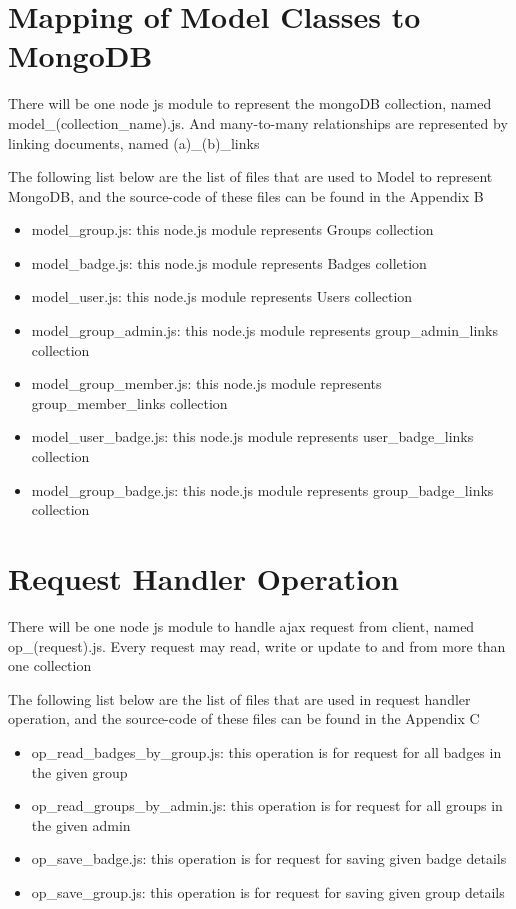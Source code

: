\section{Mapping of Model Classes to MongoDB}
There will be one node js module to represent the mongoDB collection, named model{\_}(collection{\_}name).js. And many-to-many relationships are represented by linking documents, named (a){\_}(b){\_}links

The following list below are the list of files that are used to Model to represent MongoDB, and the source-code of these files can be found in the Appendix B

\begin{itemize}
\item model{\_}group.js: this node.js module represents Groups collection
\item model{\_}badge.js: this node.js module represents Badges colletion
\item model{\_}user.js: this node.js module represents Users collection
\item model{\_}group{\_}admin.js: this node.js module represents group{\_}admin{\_}links collection
\item model{\_}group{\_}member.js: this node.js module represents group{\_}member{\_}links collection
\item model{\_}user{\_}badge.js: this node.js module represents user{\_}badge{\_}links collection
\item model{\_}group{\_}badge.js: this node.js module represents group{\_}badge{\_}links collection
\end{itemize}

\section{Request Handler Operation}
There will be one node js module to handle ajax request from client, named op{\_}(request).js. Every request may read, write or update to and from more than one collection

The following list below are the list of files that are used in request handler operation, and the source-code of these files can be found in the Appendix C

\begin{itemize}
\item op{\_}read{\_}badges{\_}by{\_}group.js: this operation is for request for all badges in the given group
\item op{\_}read{\_}groups{\_}by{\_}admin.js: this operation is for request for all groups in the given admin
\item op{\_}save{\_}badge.js: this operation is for request for saving given badge details
\item op{\_}save{\_}group.js: this operation is for request for saving given group details
\end{itemize}

